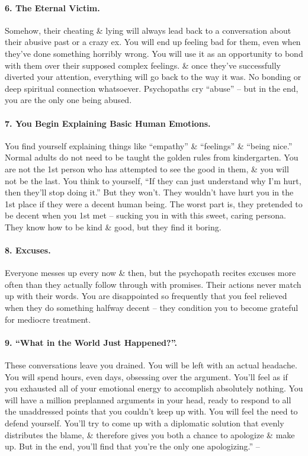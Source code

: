 \documentclass{article}
\numberwithin{equation}{section}
\begin{document}
\paragraph{6. The Eternal Victim.} Somehow, their cheating \& lying will always lead back to a conversation about their abusive past or a crazy ex. You will end up feeling bad for them, even when they've done something horribly wrong. You will use it as an opportunity to bond with them over their supposed complex feelings. \& once they've successfully diverted your attention, everything will go back to the way it was. No bonding or deep spiritual connection whatsoever. Psychopaths cry ``abuse'' -- but in the end, you are the only one being abused.

\paragraph{7. You Begin Explaining Basic Human Emotions.} You find yourself explaining things like ``empathy'' \& ``feelings'' \& ``being nice.'' Normal adults do not need to be taught the golden rules from kindergarten. You are not the 1st person who has attempted to see the good in them, \& you will not be the last. You think to yourself, ``If they can just understand why I'm hurt, then they'll stop doing it.'' But they won't. They wouldn't have hurt you in the 1st place if they were a decent human being. The worst part is, they pretended to be decent when you 1st met -- sucking you in with this sweet, caring persona. They know how to be kind \& good, but they find it boring.

\paragraph{8. Excuses.} Everyone messes up every now \& then, but the psychopath recites excuses more often than they actually follow through with promises. Their actions never match up with their words. You are disappointed so frequently that you feel relieved when they do something halfway decent -- they condition you to become grateful for mediocre treatment.

\paragraph{9. ``What in the World Just Happened?''.} These conversations leave you drained. You will be left with an actual headache. You will spend hours, even days, obsessing over the argument. You'll feel as if you exhausted all of your emotional energy to accomplish absolutely nothing. You will have a million preplanned arguments in your head, ready to respond to all the unaddressed points that you couldn't keep up with. You will feel the need to defend yourself. You'll try to come up with a diplomatic solution that evenly distributes the blame, \& therefore gives you both a chance to apologize \& make up. But in the end, you'll find that you're the only one apologizing.'' -- \cite[pp. 43--46]{MacKenzie2015}
\end{document}

